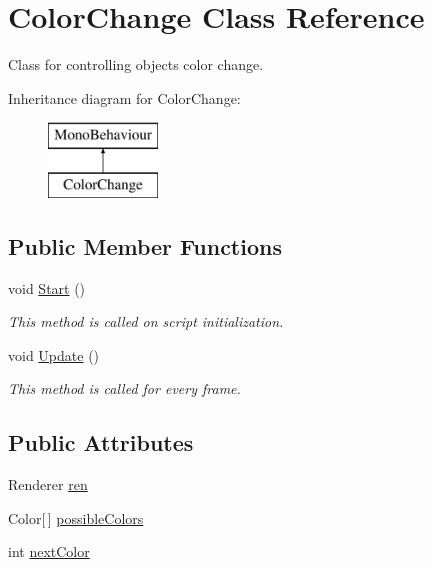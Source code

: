 \hypertarget{class_color_change}{}\section{Color\+Change Class Reference}
\label{class_color_change}


Class for controlling object\textquotesingle{}s color change.  


Inheritance diagram for Color\+Change\+:\begin{figure}[H]
\begin{center}
\leavevmode
\includegraphics[height=2.000000cm]{class_color_change}
\end{center}
\end{figure}
\subsection*{Public Member Functions}
\begin{DoxyCompactItemize}
\item 
void \hyperlink{class_color_change_a7851038dd8fb7ee037e3572e5ea0820e}{Start} ()
\begin{DoxyCompactList}\small\item\em This method is called on script initialization. \end{DoxyCompactList}\item 
void \hyperlink{class_color_change_adcff0a9a82823d3e0c08ac2aa6dad8c6}{Update} ()
\begin{DoxyCompactList}\small\item\em This method is called for every frame. \end{DoxyCompactList}\end{DoxyCompactItemize}
\subsection*{Public Attributes}
\begin{DoxyCompactItemize}
\item 
Renderer \hyperlink{class_color_change_a325e912ee57c39a0fa9187988dac05de}{ren}
\item 
Color\mbox{[}$\,$\mbox{]} \hyperlink{class_color_change_a82d62c6de3e5c99613d876af2de00627}{possible\+Colors}
\item 
int \hyperlink{class_color_change_a24d6e49ea48325fb5fb722bb80264339}{next\+Color}
\end{DoxyCompactItemize}


